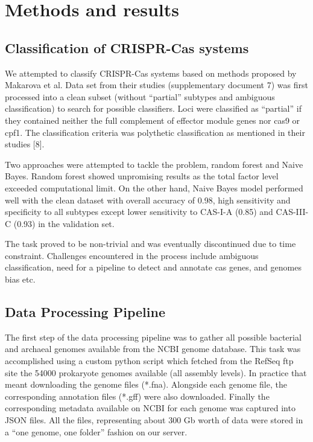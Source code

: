 \documentclass[11pt, a4paper,titlepage]{article}
\begin{document}
\section{Methods and results}

\subsection{Classification of CRISPR-Cas systems}
We attempted to classify CRISPR-Cas systems based on methods proposed
by Makarova et al. Data set from their studies (supplementary document
7) was first processed into a clean subset (without “partial” subtypes
and ambiguous classification) to search for possible classifiers. Loci
were classified as “partial” if they contained neither the full
complement of effector module genes nor cas9 or cpf1. The
classification criteria was polythetic classification as mentioned in
their studies [8].

Two approaches were attempted to tackle the problem, random forest and
Naive Bayes. Random forest showed unpromising results as the total
factor level exceeded computational limit. On the other hand, Naive
Bayes model performed well with the clean dataset with overall
accuracy of 0.98, high sensitivity and specificity to all subtypes
except lower sensitivity to CAS-I-A (0.85) and CAS-III-C (0.93) in the
validation set.

The task proved to be non-trivial and was eventually discontinued due
to time constraint. Challenges encountered in the process include
ambiguous classification, need for a pipeline to detect and annotate
cas genes, and genomes bias etc.

\subsection{Data Processing Pipeline}

The first step of the data processing pipeline was to gather all
possible bacterial and archaeal genomes available from the NCBI genome
database. This task was accomplished using a custom python script
which fetched from the RefSeq ftp site \cite{pruitt2007ncbi} the 54000
prokaryote genomes available (all assembly levels). In practice that
meant downloading the genome files (*.fna). Alongside each genome
file, the corresponding annotation files (*.gff) were also
downloaded. Finally the corresponding metadata available on NCBI for
each genome was captured into JSON files. All the files, representing
about 300 Gb worth of data were stored in a ``one genome, one folder''
fashion on our server.
\end{document}

